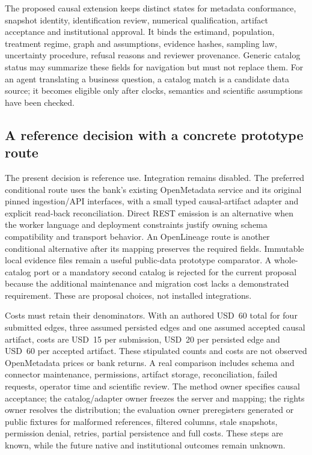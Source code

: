The proposed causal extension keeps distinct states for metadata conformance,
snapshot identity, identification review, numerical qualification, artifact
acceptance and institutional approval. It binds the estimand, population,
treatment regime, graph and assumptions, evidence hashes, sampling law,
uncertainty procedure, refusal reasons and reviewer provenance. Generic catalog
status may summarize these fields for navigation but must not replace them.
For an agent translating a business question, a catalog match is a candidate
data source; it becomes eligible only after clocks, semantics and scientific
assumptions have been checked.

\subsection{A reference decision with a concrete prototype route}

The present decision is reference use. Integration remains disabled. The
preferred conditional route uses the bank's existing OpenMetadata service and
its original pinned ingestion/API interfaces, with a small typed causal-artifact
adapter and explicit read-back reconciliation. Direct REST emission is an
alternative when the worker language and deployment constraints justify owning
schema compatibility and transport behavior. An OpenLineage route is another
conditional alternative after its mapping preserves the required fields.
Immutable local evidence files remain a useful public-data prototype comparator.
A whole-catalog port or a mandatory second catalog is rejected for the current
proposal because the additional maintenance and migration cost lacks a
demonstrated requirement. These are proposal choices, not installed integrations.
\citep{exec24_openmetadata_source,exec24_openmetadata_reference}

Costs must retain their denominators. With an authored USD~60 total for four
submitted edges, three assumed persisted edges and one assumed accepted causal
artifact, costs are USD~15 per submission, USD~20 per persisted edge and USD~60
per accepted artifact. These stipulated counts and costs are not observed
OpenMetadata prices or bank returns. A real comparison includes schema and
connector maintenance, permissions, artifact storage, reconciliation, failed
requests, operator time and scientific review. The method owner specifies causal
acceptance; the catalog/adapter owner freezes the server and mapping; the rights
owner resolves the distribution; the evaluation owner preregisters generated
or public fixtures for malformed references, filtered columns, stale snapshots,
permission denial, retries, partial persistence and full costs. These steps are
known, while the future native and institutional outcomes remain unknown.
\citep{exec24_openmetadata_reference}

